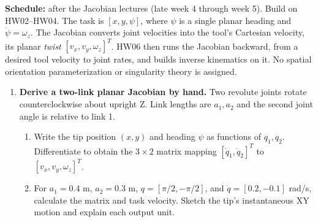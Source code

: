 

\textbf{Schedule:} after the Jacobian lectures (late week 4 through week 5).
Build on HW02--HW04. The task is $[x,y,\psi]$, where $\psi$ is a single planar
heading and $\dot\psi=\omega_z$. The Jacobian converts joint velocities
into the tool's Cartesian velocity, its planar \emph{twist}
$[v_x,v_y,\omega_z]^T$. HW06 then runs the Jacobian backward, from
a desired tool velocity to joint rates, and builds inverse kinematics on it.
No spatial orientation parameterization or singularity theory is assigned.

\begin{enumerate}
\item \textbf{Derive a two-link planar Jacobian by hand.}
Two revolute joints rotate counterclockwise about upright Z. Link lengths
are $a_1,a_2$ and the second joint angle is relative to link 1.
\begin{enumerate}
\item Write the tip position $(x,y)$ and heading $\psi$ as functions of
$q_1,q_2$. Differentiate to obtain the $3\times2$ matrix mapping
$[\dot q_1,\dot q_2]^T$ to $[v_x,v_y,\omega_z]^T$.
\item For $a_1=0.4$ m, $a_2=0.3$ m, $q=[\pi/2,-\pi/2]$, and
$\dot q=[0.2,-0.1]$ rad/s, calculate the matrix and task velocity.
Sketch the tip's instantaneous XY motion and explain each output unit.
\end{enumerate}


\end{enumerate}
